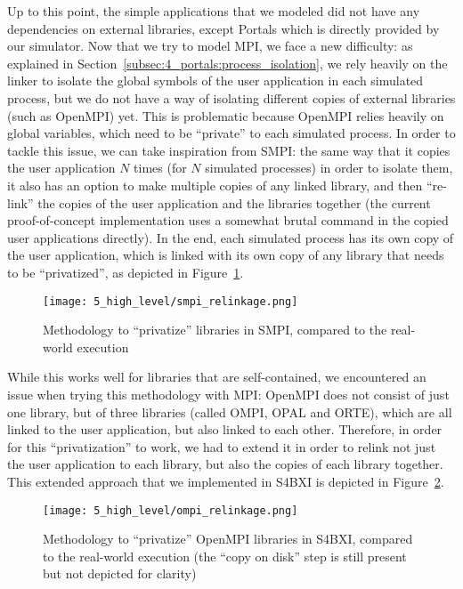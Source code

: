 Up to this point, the simple applications that we modeled did not have any
dependencies on external libraries, except Portals which is directly provided by
our simulator. Now that we try to model MPI, we face a new difficulty: as
explained in Section~\ref{subsec:4_portals:process_isolation}, we rely heavily
on the linker to isolate the global symbols of the user application in each
simulated process, but we do not have a way of isolating different copies of
external libraries (such as OpenMPI) yet. This is problematic because OpenMPI
relies heavily on global variables, which need to be ``private'' to each
simulated process. In order to tackle this issue, we can take inspiration from
SMPI: the same way that it copies the user application $N$ times (for $N$
simulated processes) in order to isolate them, it also has an option to make
multiple copies of any linked library, and then ``re-link'' the copies of the
user application and the libraries together (the current proof-of-concept
implementation uses a somewhat brutal  command in the copied user
applications directly). In the end, each simulated process has its own copy of
the user application, which is linked with its own copy of any library that
needs to be ``privatized'', as depicted in
Figure~\ref{fig:5_high_level:smpi_relinkage}.

\begin{figure}[!ht]
    \centering
    \texttt{[image: 5\_high\_level/smpi\_relinkage.png]}
    \caption{Methodology to ``privatize'' libraries in SMPI, compared to the real-world execution}
    \label{fig:5_high_level:smpi_relinkage}
\end{figure}

While this works well for libraries that are self-contained, we encountered an
issue when trying this methodology with MPI: OpenMPI does not consist of just
one library, but of three libraries (called OMPI, OPAL and ORTE), which are all
linked to the user application, but also linked to each other. Therefore, in
order for this ``privatization'' to work, we had to extend it in order to relink
not just the user application to each library, but also the copies of each
library together. This extended approach that we implemented in S4BXI is
depicted in Figure~\ref{fig:5_high_level:ompi_relinkage}.

\begin{figure}[!ht]
    \centering
    \texttt{[image: 5\_high\_level/ompi\_relinkage.png]}
    \caption{Methodology to ``privatize'' OpenMPI libraries in S4BXI, compared to the real-world execution (the ``copy on disk'' step is still present but not depicted for clarity)}
    \label{fig:5_high_level:ompi_relinkage}
\end{figure}

